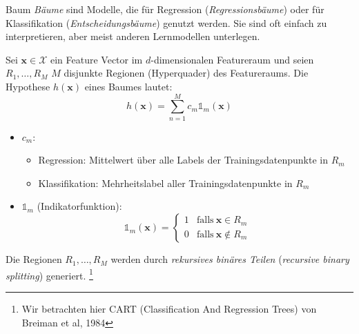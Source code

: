 \begin{defi}{Baum}
    \emph{Bäume} sind Modelle, die für Regression (\emph{Regressionsbäume}) oder für Klassifikation (\emph{Entscheidungsbäume}) genutzt werden.
    Sie sind oft einfach zu interpretieren, aber meist anderen Lernmodellen unterlegen.

    Sei $\mathbf{x} \in \mathcal{X}$ ein Feature Vector im $d$-dimensionalen Featureraum und seien $R_1, \ldots, R_M$ $M$ disjunkte Regionen (Hyperquader) des Featureraums.
    Die Hypothese $h(\mathbf{x})$ eines Baumes lautet:
    \[
        h(\mathbf{x}) = \sum_{n=1}^M c_m \mathbb{1}_m (\mathbf{x})
    \]
    \begin{itemize}
        \item $c_m$:
              \begin{itemize}
                  \item Regression: Mittelwert über alle Labels der Trainingsdatenpunkte in $R_m$
                  \item Klassifikation: Mehrheitslabel aller Trainingsdatenpunkte in $R_m$
              \end{itemize}
        \item $\mathbb{1}_m$ (Indikatorfunktion):
              \[
                  \mathbb{1}_m (\mathbf{x}) = \begin{cases}
                      1 & \text{falls} \ \mathbf{x} \in R_m    \\
                      0 & \text{falls} \ \mathbf{x} \notin R_m
                  \end{cases}
              \]
    \end{itemize}

    Die Regionen $R_1, \ldots, R_M$ werden durch \emph{rekursives binäres Teilen} (\emph{recursive binary splitting}) generiert.
    \footnote{
        Wir betrachten hier CART (Classification And Regression Trees) von Breiman et al, 1984
    }
\end{defi}

